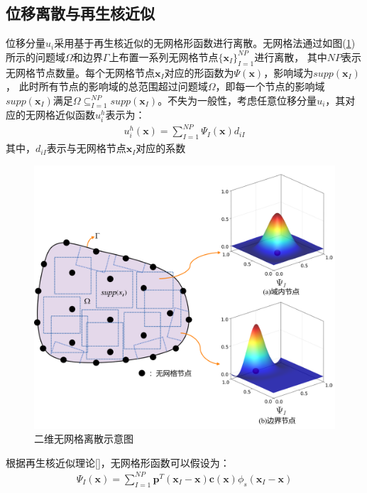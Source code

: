 \subsection{位移离散与再生核近似}
位移分量$u_i$采用基于再生核近似的无网格形函数进行离散。无网格法通过如图(\ref{PSI})所示的问题域$\Omega$和边界$\Gamma$上布置一系列无网格节点$\{\pmb{x}_I\}^{N\!P}_{I=1}$进行离散，
其中$N\!P$表示无网格节点数量。每个无网格节点$\pmb{x}_I$对应的形函数为$\Psi(\pmb{x})$，影响域为$supp(\pmb{x}_I)$，
此时所有节点的影响域的总范围超过问题域$\Omega$，即每一个节点的影响域$supp(\pmb{x}_I)$满足$\Omega\subseteq^{N\!P}_{I=1}supp(\pmb{x}_I)$。不失为一般性，考虑任意位移分量$u_i$，其对应的无网格近似函数$u^h_i$表示为：
\begin{equation}\label{ui}
\begin{split}
    u^h_i(\pmb{x})=\sum_{I=1}^{N\!P}\Psi_I(\pmb{x})d_{iI}
\end{split}
\end{equation}
其中，$d_{iI}$表示与无网格节点$\pmb{x}_I$对应的系数\par
\begin{figure}[!h]
    \centering
    \includegraphics[scale=0.5]{figure/E/PSI.png}
    \caption{二维无网格离散示意图}\label{PSI}
\end{figure}\newpage
根据再生核近似理论[]，无网格形函数可以假设为：
\begin{equation}\label{shapefunction}
\begin{split}
    \Psi_I(\pmb{x})=\sum_{I=1}^{N\!P}\pmb{p}^T(\pmb{x}_I-\pmb{x})\pmb{c}(\pmb{x})\phi_s(\pmb{x}_I-\pmb{x})
\end{split}
\end{equation}
